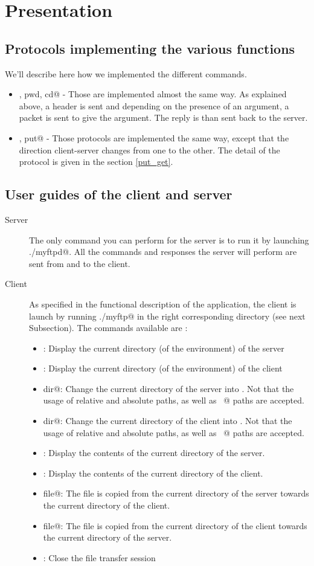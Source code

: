 \documentclass{article}
\begin{document}
\section{Presentation}
\subsection{Protocols implementing the various functions}
We'll describe here how we implemented the different commands.
\begin{itemize}
    \item \verb@ls, pwd, cd@ - Those are implemented almost the same way. As explained above, a header is sent and depending on the presence of an argument, a packet is sent to give the argument. The reply is than sent back to the server.
    \item \verb@get, put@ - Those protocols are implemented the same way, except that the direction client-server changes from one to the other. The detail of the protocol is given in the section \ref{put_get}.
\end{itemize}
\subsection{User guides of the client and server}
\begin{description}
\item[Server] The only command you can perform for the server is to run it by launching \verb@./myftpd@. All the commands and responses the server will perform are sent from and to the client.
\item[Client] As specified in the functional description of the application, the client is launch by running \verb@./myftp@ in the right corresponding directory (see next Subsection). The commands available are :
\begin{itemize}
\item \verb@pwd@: Display the current directory (of the environment) of the server
\item \verb@lpwd@: Display the current directory (of the environment) of the client
\item \verb@cd dir@: Change the current directory of the server into \verb@dir@. Not that the usage of relative and absolute paths, as well as \verb@~@ paths  are accepted.
\item \verb@lcd dir@: Change the current directory of the client into \verb@dir@. Not that the usage of relative and absolute paths, as well as \verb@~@ paths  are accepted.
\item \verb@ls@: Display the contents of the current directory of the server.
\item \verb@lls@: Display the contents of the current directory of the client.
\item \verb@get file@: The file \verb@file@ is copied from the current directory of the server towards the current directory of the client.
\item \verb@put file@: The file \verb@file@ is copied from the current directory of the client towards the current directory of the server.
\item \verb@bye@: Close the file transfer session
\end{itemize}
\end{description}
\end{document}
